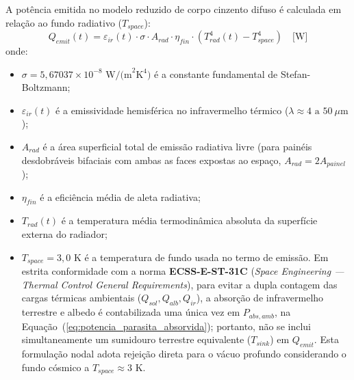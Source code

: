 A potência emitida no modelo reduzido de corpo cinzento difuso é calculada em relação ao fundo radiativo ($T_{space}$):
\begin{equation}
    Q_{emit}(t) = \varepsilon_{ir}(t) \cdot \sigma \cdot A_{rad} \cdot \eta_{fin} \cdot \left( T_{rad}^4(t) - T_{space}^4 \right) \quad \text{[W]}
    \label{eq:stefan_boltzmann_radiador_rigoroso}
\end{equation}
onde:
\begin{itemize}[leftmargin=*]
    \item $\sigma = 5{,}67037 \times 10^{-8}\text{ W/(m}^2\text{K}^4)$ é a constante fundamental de Stefan-Boltzmann;
    \item $\varepsilon_{ir}(t)$ é a emissividade hemisférica no infravermelho térmico ($\lambda \approx 4\text{ a }50\ \mu\text{m}$);
    \item $A_{rad}$ é a área superficial total de emissão radiativa livre (para painéis desdobráveis bifaciais com ambas as faces expostas ao espaço, $A_{rad} = 2 A_{painel}$);
    \item $\eta_{fin}$ é a eficiência média de aleta radiativa;
    \item $T_{rad}(t)$ é a temperatura média termodinâmica absoluta da superfície externa do radiador;
    \item $T_{space}=3{,}0\text{ K}$ é a temperatura de fundo usada no termo de emissão. Em estrita conformidade com a norma \textbf{ECSS-E-ST-31C} (\textit{Space Engineering --- Thermal Control General Requirements}), para evitar a dupla contagem das cargas térmicas ambientais ($Q_{sol}, Q_{alb}, Q_{ir}$), a absorção de infravermelho terrestre e albedo é contabilizada uma única vez em $P_{abs,amb}$, na Equação~(\ref{eq:potencia_parasita_absorvida}); portanto, não se inclui simultaneamente um sumidouro terrestre equivalente ($T_{sink}$) em $Q_{emit}$. Esta formulação nodal adota rejeição direta para o vácuo profundo considerando o fundo cósmico a $T_{space} \approx 3\text{ K}$.
\end{itemize}

